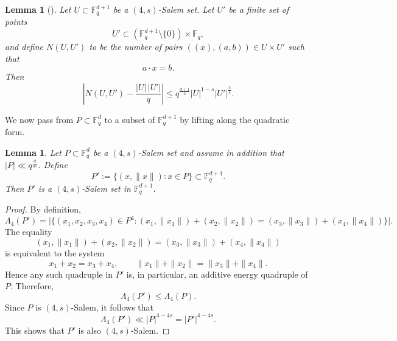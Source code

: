 \documentclass{article}
\newtheorem{lemma}[theorem]{Lemma}
\def\steven#1{\noindent
\textcolor{red}
{\textsc{(Steven:}
\textsf{#1})}}
\begin{document}
\begin{lemma}[{\cite[Lemma 37]{CGKPTZ25}}]\label{lm-counting}
Let $U \subset \mathbb{F}_q^{d+1}$ be a $(4,s)$-Salem set. Let $U'$ be a finite set of points
\[
U' \subset (\mathbb{F}_q^{d+1} \setminus \{0\}) \times \mathbb{F}_q,
\]
and define $N(U,U')$ to be the number of pairs $((x),({a},b)) \in U \times U'$ such that
\[
{a} \cdot {x} = b.
\]
Then
\[
\left| N(U,U') - \frac{|U| \, |U'|}{q} \right|
\le q^{\frac{d+1}{4}} |U|^{1-s} |U'|^{\frac{3}{4}}.
\]
\end{lemma}
We now pass from $P \subset \mathbb{F}_q^d$ to a subset of $\mathbb{F}_q^{d+1}$ by lifting along the quadratic form.
\begin{lemma}\label{lem:lift-salem}
Let $P \subset \mathbb{F}_q^d$ be a $(4,s)$-Salem set 
and assume in addition that $|P| \ll q^{\frac{d}{4s}}$.
Define
\[
P' := \{ (x,\|x\|) : x\in P \} \subset \mathbb{F}_q^{d+1}.
\]
Then $P'$ is a $(4,s)$-Salem set in $\mathbb{F}_q^{d+1}$.
\end{lemma}

\begin{proof}
By definition,
\[
\Lambda_4(P') = \bigl|\{(x_1,x_2,x_3,x_4) \in P^4 :
(x_1,\|x_1\|) + (x_2,\|x_2\|) = (x_3,\|x_3\|) + (x_4,\|x_4\|) \}\bigr|.
\]
The equality
\[
(x_1,\|x_1\|) + (x_2,\|x_2\|) = (x_3,\|x_3\|)
+ (x_4,\|x_4\|)
\]
is equivalent to the system
\[
x_1 + x_2 = x_3 + x_4, \qquad
\|x_1\| + \|x_2\| = \|x_3\| + \|x_4\|.
\]
Hence any such quadruple in $P'$ is, in particular, an additive energy quadruple of $P$. Therefore,
\[
\Lambda_4(P') \le \Lambda_4(P).
\]
Since $P$ is $(4,s)$-Salem, it follows that
\[
\Lambda_4(P') \ll |P|^{4-4s} = |P'|^{4-4s}.
\]
This shows that $P'$ is also $(4,s)$-Salem.
\end{proof}


\end{document}
